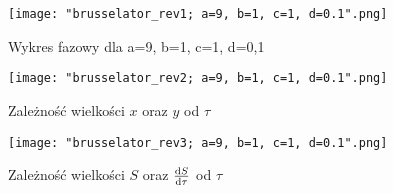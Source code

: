 \documentclass[10pt, a4paper, twoside, onecolumn]{article}
\numberwithin{equation}{section}
\begin{document}
	\begin{figure}[H]
		\centering
		\texttt{[image: "brusselator\_rev1; a=9, b=1, c=1, d=0.1".png]}
		\caption{Wykres fazowy dla a=9, b=1, c=1, d=0,1}
	\end{figure}
	\begin{figure}[H]
		\centering
		\texttt{[image: "brusselator\_rev2; a=9, b=1, c=1, d=0.1".png]}
		\caption{Zależność wielkości \(x\) oraz \(y\) od \(\tau\)}
	\end{figure}
	\begin{figure}[H]
		\centering
		\texttt{[image: "brusselator\_rev3; a=9, b=1, c=1, d=0.1".png]}
		\caption{Zależność wielkości \(S\) oraz \(\dv{S}{\tau}\) od \(\tau\)}
	\end{figure}
\end{document}
